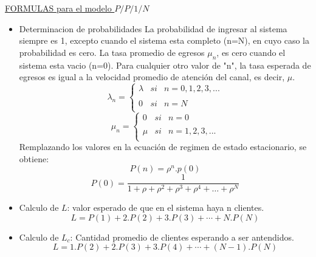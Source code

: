 \documentclass{article}
\begin{document}
\noindent
\underline{FORMULAS para el modelo \(P/P/1/N\)}
\begin{itemize}
    \item Determinacion de probabilidades
    \newline La probabilidad de ingresar al sistema siempre es 1, excepto cuando el sistema esta completo (n=N), en cuyo caso la probabilidad es cero.
    \newline La tasa promedio de egresos \(\mu_n\), es cero cuando el sistema esta vacio (n=0). Para cualquier otro valor de "n", la tasa esperada de egresos es igual a la velocidad promedio de atención del canal, es decir, \(\mu\).    
        \[
            \lambda_n = \left\{ \begin{array}{lcc}
                 \lambda &  si & n =0,1,2,3,... \\
                \\ 0 &   si  & n = N \\
                \end{array}
            \right.
        \]
        \[
            \mu_n = \left\{ \begin{array}{lcc}
                0 &   si  & n = 0 \\
                \\ \mu &  si & n = 1,2,3,... \\
                \end{array}
            \right.
        \]
        Remplazando los valores en la ecuación de regimen de estado estacionario, se obtiene:
        \begin{equation} \label{eu_eqn}
            P(n) = \rho^n . p(0)
        \end{equation}
        \begin{equation} \label{eu_eqn}
            P(0) = \frac{1}{1+\rho+\rho^2+\rho^3+\rho^4+\dots+\rho^N}
        \end{equation}
    \item Calculo de \(L\): valor esperado de que en el sistema haya n clientes.
        \begin{equation} \label{eu_eqn}
            L = P(1) + 2.P(2) + 3.P(3) + \cdots + N.P(N)
        \end{equation}
    \item Calculo de \(L_c\): Cantidad promedio de clientes esperando a ser antendidos.
        \begin{equation} \label{eu_eqn}
            L = 1.P(2) + 2.P(3) + 3.P(4) + \cdots + (N-1).P(N)
        \end{equation}

\end{itemize}
\end{document}
